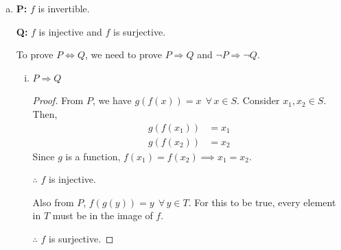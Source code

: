 \documentclass[12pt]{article}
\begin{document}
\begin{enumerate}[(a)]
      \item
            {\bf P:} $f$ is invertible.

                  {\bf Q:} $f$ is injective and $f$ is surjective.

            To prove $P \Longleftrightarrow Q$, we need to prove $P \Longrightarrow Q$ and $\neg P \Longrightarrow \neg Q$.
            \begin{enumerate}[(i)]
                  \item $P \Longrightarrow Q$


                        \begin{proof}
                              From $P$, we have $g(f(x)) = x \ \ \forall \, x \in S$.
                              Consider $x_1, x_2 \in S$. Then,
                              \begin{align*}
                                    g(f(x_1)) & = x_1 \\
                                    g(f(x_2)) & = x_2
                              \end{align*}
                              Since $g$ is a function, $f(x_1) = f(x_2) \implies x_1 = x_2$.


                              $\therefore$ $f$ is injective.
                              \newline

                              Also from $P$, $f(g(y)) = y \ \ \forall \, y \in T$.
                              For this to be true, every element in $T$ must be
                              in the image of $f$.

                              $\therefore$ $f$ is surjective.


\end{proof}
\end{enumerate}
\end{enumerate}
\end{document}

